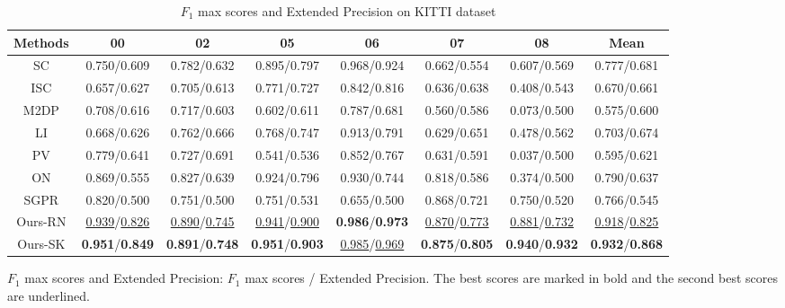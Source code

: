 \documentclass[letterpaper, 10 pt, conference]{ieeeconf}  %
\begin{document}
  \begin{table*}[htb]\footnotesize
    \caption{\centering \(F_1\) max scores and Extended Precision on KITTI dataset}\vspace{-3mm}
    \label{table:F1}
    \begin{center}
    \begin{threeparttable}
        {
    \begin{tabular}{c c c c c c c c}
    \hline
    Methods & 00 & 02 & 05 & 06 & 07 &08&Mean\\ 
    \hline
    SC\cite{SC} & 0.750/0.609 & 0.782/0.632 &0.895/0.797&0.968/0.924&0.662/0.554&0.607/0.569&0.777/0.681\\
    ISC\cite{ISC}&0.657/0.627&0.705/0.613&0.771/0.727&0.842/0.816&0.636/0.638&0.408/0.543&0.670/0.661\\
    M2DP\cite{M2DP}&0.708/0.616&0.717/0.603&0.602/0.611&0.787/0.681&0.560/0.586&0.073/0.500&0.575/0.600\\
    LI\cite{LI}&0.668/0.626&0.762/0.666&0.768/0.747&0.913/0.791&0.629/0.651&0.478/0.562&0.703/0.674\\
    PV\cite{PV}&0.779/0.641&0.727/0.691&0.541/0.536&0.852/0.767&0.631/0.591&0.037/0.500&0.595/0.621\\
    ON\cite{ON}&0.869/0.555&0.827/0.639&0.924/0.796&0.930/0.744&0.818/0.586&0.374/0.500&0.790/0.637\\
    SGPR\cite{SGPR}&0.820/0.500&0.751/0.500&0.751/0.531&0.655/0.500&0.868/0.721&0.750/0.520&0.766/0.545\\
    Ours-RN&\underline{0.939}/\underline{0.826}&\underline{0.890}/\underline{0.745}&\underline{0.941}/\underline{0.900}&\textbf{0.986}/\textbf{0.973}&\underline{0.870}/\underline{0.773}&\underline{0.881}/\underline{0.732}&\underline{0.918}/\underline{0.825}\\
    Ours-SK&\textbf{0.951}/\textbf{0.849}&\textbf{0.891}/\textbf{0.748}&\textbf{0.951}/\textbf{0.903}&\underline{0.985}/\underline{0.969}&\textbf{0.875}/\textbf{0.805}&\textbf{0.940}/\textbf{0.932}&\textbf{0.932}/\textbf{0.868}\\
    \hline
    \end{tabular}
    }
    \begin{tablenotes} 
        \footnotesize
        \item \(F_1\) max scores and Extended Precision: \(F_1\) max scores / Extended Precision. The best scores are marked in bold and the second best scores are underlined.
     \end{tablenotes}
    \end{threeparttable}
    \end{center}
    \end{table*}
\end{document}
